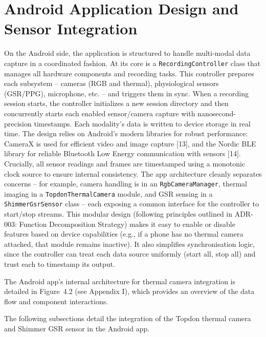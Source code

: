 \section{Android Application Design and Sensor Integration}\label{sec:4-2}
On the Android side, the application is structured to handle multi-modal data capture in a coordinated fashion. At its core is a \texttt{RecordingController} class that manages all hardware components and recording tasks. This controller prepares each subsystem -- cameras (RGB and thermal), physiological sensors (GSR/PPG), microphone, etc. -- and triggers them in sync. When a recording session starts, the controller initializes a new session directory and then concurrently starts each enabled sensor/camera capture with nanosecond-precision timestamps. Each modality's data is written to device storage in real time. The design relies on Android's modern libraries for robust performance: CameraX is used for efficient video and image capture [13], and the Nordic BLE library for reliable Bluetooth Low Energy communication with sensors [14]. Crucially, all sensor readings and frames are timestamped using a monotonic clock source to ensure internal consistency. The app architecture cleanly separates concerns -- for example, camera handling is in an \texttt{RgbCameraManager}, thermal imaging in a \texttt{TopdonThermalCamera} module, and GSR sensing in a \texttt{ShimmerGsrSensor} class -- each exposing a common interface for the controller to start/stop streams. This modular design (following principles outlined in ADR-003: Function Decomposition Strategy) makes it easy to enable or disable features based on device capabilities (e.g., if a phone has no thermal camera attached, that module remains inactive). It also simplifies synchronisation logic, since the controller can treat each data source uniformly (start all, stop all) and trust each to timestamp its output.

The Android app's internal architecture for thermal camera integration is detailed in Figure~4.2 (see Appendix I), which provides an overview of the data flow and component interactions.

The following subsections detail the integration of the Topdon thermal camera and Shimmer GSR sensor in the Android app.

